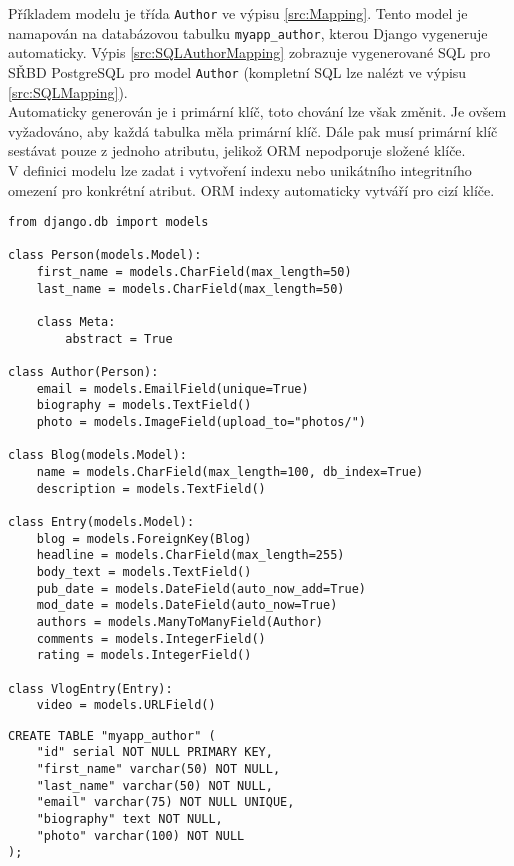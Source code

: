\documentclass[ing,male,java,dept456]{diploma}						%
\begin{document}
Příkladem modelu je třída \lstinline[style=inlinepython]|Author| ve výpisu \ref{src:Mapping}. Tento model je namapován na databázovou tabulku \lstinline[style=inlinepython]|myapp_author|, kterou Django vygeneruje automaticky. Výpis \ref{src:SQLAuthorMapping} zobrazuje vygenerované SQL pro SŘBD PostgreSQL pro model \lstinline[style=inlinepython]|Author| (kompletní SQL lze nalézt ve výpisu \ref{src:SQLMapping}). \\
Automaticky generován je i primární klíč, toto chování lze však změnit. Je ovšem vyžadováno, aby každá tabulka měla primární klíč. Dále pak musí primární klíč sestávat pouze z jednoho atributu, jelikož ORM nepodporuje složené klíče. \\
V definici modelu lze zadat i vytvoření indexu nebo unikátního integritního omezení pro konkrétní atribut. ORM indexy automaticky vytváří pro cizí klíče. \\

\begin{lstlisting}[style=custompython, emph={ Blog, Person, Author, Entry, VlogEntry}, emphstyle={\bfseries}, label=src:Mapping, caption=Modely jednoduché aplikace pro vytváření blogů v Django ORM]
from django.db import models

class Person(models.Model):
    first_name = models.CharField(max_length=50)
    last_name = models.CharField(max_length=50)

    class Meta:
        abstract = True

class Author(Person):
    email = models.EmailField(unique=True)
    biography = models.TextField()
    photo = models.ImageField(upload_to="photos/")

class Blog(models.Model):
    name = models.CharField(max_length=100, db_index=True)
    description = models.TextField()

class Entry(models.Model):
    blog = models.ForeignKey(Blog)
    headline = models.CharField(max_length=255)
    body_text = models.TextField()
    pub_date = models.DateField(auto_now_add=True)
    mod_date = models.DateField(auto_now=True)
    authors = models.ManyToManyField(Author)
    comments = models.IntegerField()
    rating = models.IntegerField()

class VlogEntry(Entry):
    video = models.URLField()

\end{lstlisting}

\begin{lstlisting}[label=src:SQLAuthorMapping, caption=Reprezentace modelu Author v PostgreSQL vygenerovaná rámcem Django ORM, style=customsql]
CREATE TABLE "myapp_author" (
    "id" serial NOT NULL PRIMARY KEY,
    "first_name" varchar(50) NOT NULL,
    "last_name" varchar(50) NOT NULL,
    "email" varchar(75) NOT NULL UNIQUE,
    "biography" text NOT NULL,
    "photo" varchar(100) NOT NULL
);
\end{lstlisting}
\end{document}
